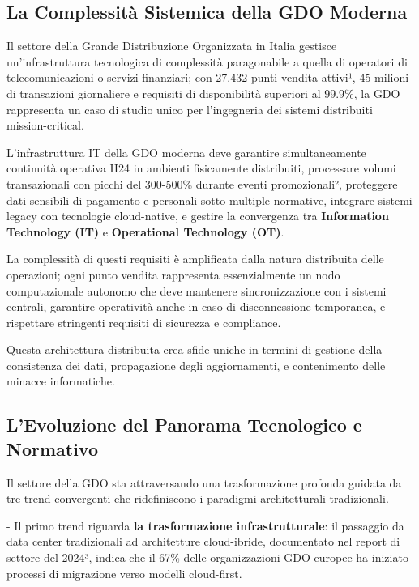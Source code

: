\documentclass{report}
\begin{document}
\subsection{\texorpdfstring{\textbf{La Complessità Sistemica
della GDO
Moderna}}{1.1.1 La Complessità Sistemica della GDO Moderna}}\label{la-complessituxe0-sistemica-della-gdo-moderna}

Il settore della Grande Distribuzione Organizzata in Italia gestisce
un'infrastruttura tecnologica di complessità paragonabile a quella di
operatori di telecomunicazioni o servizi finanziari; con 27.432 punti
vendita attivi¹, 45 milioni di transazioni giornaliere e requisiti di
disponibilità superiori al 99.9\%, la GDO rappresenta un caso di studio
unico per l'ingegneria dei sistemi distribuiti mission-critical.

L'infrastruttura IT della GDO moderna deve garantire simultaneamente
continuità operativa H24 in ambienti fisicamente distribuiti, processare
volumi transazionali con picchi del 300-500\% durante eventi
promozionali², proteggere dati sensibili di pagamento e personali sotto
multiple normative, integrare sistemi legacy con tecnologie
cloud-native, e gestire la convergenza tra \textbf{Information Technology (IT)} e
\textbf{Operational Technology (OT)}.

La complessità di questi requisiti è amplificata dalla natura
distribuita delle operazioni; ogni punto vendita rappresenta
essenzialmente un nodo computazionale autonomo che deve mantenere
sincronizzazione con i sistemi centrali, garantire operatività anche in
caso di disconnessione temporanea, e rispettare stringenti requisiti di
sicurezza e compliance.

Questa architettura distribuita crea sfide uniche in termini di gestione
della consistenza dei dati, propagazione degli aggiornamenti, e
contenimento delle minacce informatiche.

\subsection{\texorpdfstring{\textbf{L'Evoluzione del Panorama
Tecnologico e
Normativo}}{L'Evoluzione del Panorama Tecnologico e Normativo}}\label{levoluzione-del-panorama-tecnologico-e-normativo}

Il settore della GDO sta attraversando una trasformazione profonda
guidata da tre trend convergenti che ridefiniscono i paradigmi
architetturali tradizionali.

- Il primo trend riguarda \textbf{la trasformazione infrastrutturale}:
il passaggio da data center tradizionali ad architetture cloud-ibride,
documentato nel report di settore del 2024³, indica che il 67\% delle
organizzazioni GDO europee ha iniziato processi di migrazione verso
modelli cloud-first.
\end{document}
